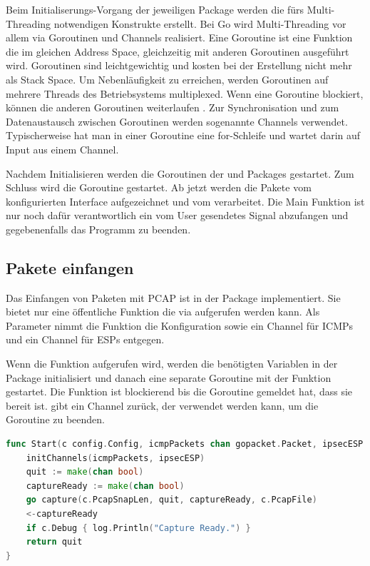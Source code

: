 Beim Initialiserungs-Vorgang der jeweiligen Package werden die fürs Multi-Threading notwendigen Konstrukte erstellt. Bei Go wird Multi-Threading vor allem via Goroutinen und Channels realisiert. Eine Goroutine ist eine Funktion die im gleichen Address Space, gleichzeitig mit anderen Goroutinen ausgeführt wird. Goroutinen sind leichtgewichtig und kosten bei der Erstellung nicht mehr als Stack Space. Um Nebenläufigkeit zu erreichen, werden Goroutinen auf mehrere Threads des Betriebsystems multiplexed. Wenn eine Goroutine blockiert, können die anderen Goroutinen weiterlaufen \cite[:1391]{effective_go}.
Zur Synchronisation und zum Datenaustausch zwischen Goroutinen werden sogenannte Channels verwendet. Typischerweise hat man in einer Goroutine eine for-Schleife und wartet darin auf Input aus einem Channel.

Nachdem Initialisieren werden die Goroutinen der  und  Packages gestartet. Zum Schluss wird die  Goroutine gestartet. Ab jetzt werden die Pakete vom konfigurierten Interface aufgezeichnet und vom \tool{} verarbeitet. Die Main Funktion ist nur noch dafür verantwortlich ein vom User gesendetes  Signal abzufangen und gegebenenfalls das Programm zu beenden.

\subsection{Pakete einfangen}
Das Einfangen von Paketen mit \ac{PCAP} ist in der  Package implementiert. Sie bietet nur eine öffentliche Funktion die via  aufgerufen werden kann. Als Parameter nimmt die Funktion die Konfiguration sowie ein Channel für \ac{ICMP}s und ein Channel für \ac{ESP}s entgegen. 

Wenn die Funktion  aufgerufen wird, werden die benötigten Variablen in der  Package initialisiert und danach eine separate Goroutine mit der  Funktion gestartet. Die  Funktion ist blockierend bis die  Goroutine gemeldet hat, dass sie bereit ist.  gibt ein Channel zurück, der verwendet werden kann, um die \linebreak {} Goroutine zu beenden.

\begin{lstlisting}[language=go, caption=Öffentliche Funktion capture.Start()]     
func Start(c config.Config, icmpPackets chan gopacket.Packet, ipsecESP chan gopacket.Packet) chan bool {
	initChannels(icmpPackets, ipsecESP)
	quit := make(chan bool)
	captureReady := make(chan bool)
	go capture(c.PcapSnapLen, quit, captureReady, c.PcapFile)
	<-captureReady
	if c.Debug { log.Println("Capture Ready.") }
	return quit
}
\end{lstlisting}

